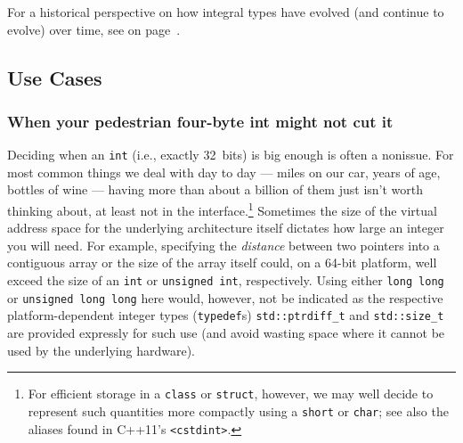 \noindent For a historical perspective on how integral types have evolved (and
continue to evolve) over time, see {\it{}} on page~\pageref{historical-perspective-on-the-evolution-of-use-of-fundamental-integral-types}.

\subsection[Use Cases]{Use Cases}\label{use-cases}

\subsubsection[When your pedestrian four-byte {\tt int} might not cut it]{When your pedestrian four-byte {\SubsubsecCode int} might not cut it}\label{when-your-pedestrian-four-byte-int-might-not-cut-it}

Deciding when an \texttt{int} (i.e., exactly 32~bits) is big enough is
often a nonissue. For most common things we deal with day to day ---
miles on our car, years of age, bottles of wine --- having more than about a
billion of them just isn't worth thinking about, at least not in the
interface.{\cprotect\footnote{For efficient storage in a \texttt{class}
or \texttt{struct}, however, we may well decide to represent such
quantities more compactly using a \texttt{short} or \texttt{char}; see
  also the aliases found in C++11's \texttt{<cstdint>}.}} Sometimes the size of the virtual address space for the
underlying architecture itself dictates how large an integer you will
need. For example, specifying the \emph{distance} between two pointers
into a contiguous array or the size of the array itself could, on a
64-bit platform, well exceed the size of an \texttt{int} or
\texttt{unsigned}~\texttt{int}, respectively. Using either
\texttt{long}~\texttt{long} or
\texttt{unsigned}~\texttt{long}~\texttt{long} here would, however, not
be indicated as the respective platform-dependent integer types
(\texttt{typedef}s) \texttt{std::ptrdiff\_t} and \texttt{std::size\_t}
are provided expressly for such use (and avoid wasting space where it
cannot be used by the underlying hardware).

